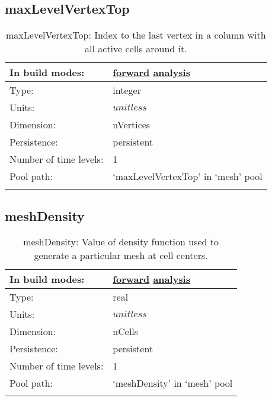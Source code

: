 \subsection[maxLevelVertexTop]{maxLevelVertexTop}
\label{subsec:var_sec_mesh_maxLevelVertexTop}
\begin{center}
\begin{longtable}{| p{2.0in} | p{4.0in} |}
        \hline 
        In build modes: & \hyperref[subsec:forward_var_tab_mesh]{forward} \hyperref[subsec:analysis_var_tab_mesh]{analysis} \\
        \hline 
        Type: & integer \\
        \hline 
        Units: & $unitless$ \\
        \hline 
        Dimension: & nVertices \\
        \hline 
        Persistence: & persistent \\
        \hline 
        Number of time levels: & 1 \\
        \hline 
            Pool path: & `maxLevelVertexTop' in `mesh' pool \\
		 \hline 
    \caption{maxLevelVertexTop: Index to the last vertex in a column with all active cells around it.}
\end{longtable}
\end{center}
\subsection[meshDensity]{meshDensity}
\label{subsec:var_sec_mesh_meshDensity}
\begin{center}
\begin{longtable}{| p{2.0in} | p{4.0in} |}
        \hline 
        In build modes: & \hyperref[subsec:forward_var_tab_mesh]{forward} \hyperref[subsec:analysis_var_tab_mesh]{analysis} \\
        \hline 
        Type: & real \\
        \hline 
        Units: & $unitless$ \\
        \hline 
        Dimension: & nCells \\
        \hline 
        Persistence: & persistent \\
        \hline 
        Number of time levels: & 1 \\
        \hline 
            Pool path: & `meshDensity' in `mesh' pool \\
		 \hline 
    \caption{meshDensity: Value of density function used to generate a particular mesh at cell centers.}
\end{longtable}
\end{center}
